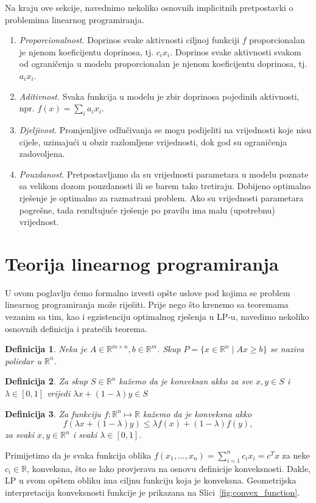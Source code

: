 \documentclass[b5paper, utf8, 11pt, colorlinks]{book}
\newtheorem{definition}{Definicija}[chapter]
\theoremstyle{definition}
\begin{document}
 
Na kraju ove sekcije, navednimo nekoliko osnovnih implicitnih pretpostavki o problemima linearnog programiranja. 
\begin{enumerate} 
    \item \emph{Proporcionalnost.} Doprinos svake aktivnosti ciljnoj funkciji $f$ proporcionalan je njenom koeficijentu doprinosa, tj. $c_ix_i$. Doprinos svake aktivnosti svakom od  ograničenja u modelu proporcionalan je njenom  koeficijentu doprinosa, tj. $a_ix_i$.
    \item  \emph{Aditivnost.} Svaka funkcija u modelu je zbir  doprinosa pojedinih aktivnosti, npr. $f(x) = \sum_i a_i x_i$.
    \item \emph{Djeljivost}. Promjenljive odlučivanja se mogu podijeliti na vrijednosti koje nisu cijele, uzimajući u obzir  razlomljene vrijednosti, dok god su ograničenja zadovoljena.  

    \item \emph{Pouzdanost}. Pretpostavljamo da su vrijednosti parametara u modelu poznate
    sa velikom dozom pouzdanosti ili se barem tako tretiraju. Dobijeno optimalno rješenje je optimalno za razmatrani problem. Ako su vrijednosti parametara pogrešne, tada rezultujuće rješenje po pravilu ima malu (upotrebnu)  vrijednost.  
\end{enumerate}

\section{Teorija linearnog programiranja}
U ovom poglavlju ćemo formalno izvesti opšte uslove pod kojima se problem linearnog programiranja može riješiti. Prije nego što krenemo sa teoremama vezanim sa tim, kao i egzistenciju optimalnog rješenja u LP-u, navedimo nekoliko osnovnih definicija i pratećih teorema. 
 \begin{definition}
	Neka je $A \in \mathbb{R}^{m \times n}, b \in \mathbb{R}^m$. Skup $P=\{x \in \mathbb{R}^n \mid Ax \geq b\}$ se naziva poliedar u $\mathbb{R}^n$. 
\end{definition}


\begin{definition}
  Za skup $S \in \mathbb{R}^n$ kažemo da je konveksan akko za sve $x,y\in S$ i $\lambda\in [0, 1]$ vrijedi $\lambda x + (1 - \lambda)y \in S$
\end{definition}
\begin{definition}
   Za funkciju $f:\mathbb{R}^n \mapsto \mathbb{R}$ kažemo da je konveksna akko 
   $$ f( \lambda x + (1-\lambda) y) \leq \lambda f(x) + (1 -\lambda) f(y),$$
   za svaki $x,y \in \mathbb{R}^n$ i svaki $\lambda \in [0,1].$
\end{definition}
 Primijetimo da je svaka funkcija oblika $f(x_1, \ldots, x_n) = \sum_{i=1}^n c_i x_i = c^T x$ za neke $c_i \in \mathbb{R}$, konveksna, što se lako provjerava na osnovu definicije konveksnosti. Dakle, LP u svom opštem obliku  ima ciljnu funkciju koja je konveksna. Geometrijska interpretacija konveksnosti funkcije je prikazana na Slici~\ref{fig:convex_function}.
\end{document}
